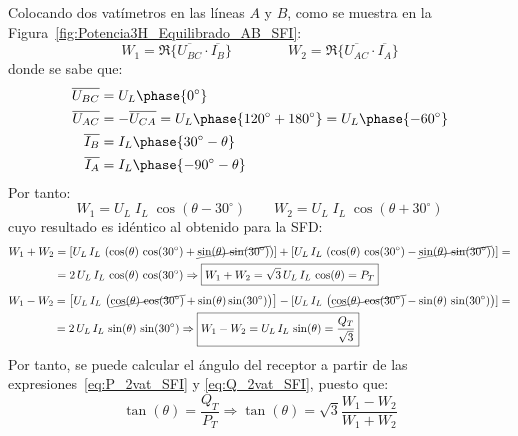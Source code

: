 	Colocando dos vatímetros en las líneas $A$ y $B$, como se muestra en la Figura~\ref{fig:Potencia3H_Equilibrado_AB_SFI}:
	\begin{equation*}
	    W_1=\Re\{\overline{U_{BC}} \cdot \overline{I_B}\}\qquad\qquad W_2=\Re\{\overline{U_{AC}} \cdot \overline{I_A}\}
	\end{equation*}
	donde se sabe que:
	\begin{align*}
	    \overline{U_{BC}}&=U_L\phase{0^\circ}\\
	   \overline{U_{AC}}&=-\overline{U_{CA}}=U_L\phase{120^\circ+180^\circ}=U_L\phase{-60^\circ}\\ \overline{I_B}&=I_L\phase{30^\circ-\theta} \\  \overline{I_A}&=I_L\phase{-90^\circ-\theta}
	\end{align*}
	Por tanto: 
	\begin{equation*}
	    W_1=U_L\;I_L\;\cos{(\theta-30^\circ)}\qquad W_2={U_L}\; {I_L}\;\cos{(\theta+30^\circ)}
	\end{equation*}
	cuyo resultado es idéntico al obtenido para la SFD: 
\begin{align}\label{eq:P_2vat_SFI}
    W_1+W_2&=\left[ U_L\,I_L\,\left( \cos(\theta)\,\cos({30^\circ}) + \cancel{\sin(\theta)\,\sin({30^\circ})}\right) \right] + [U_L\,I_L\,\left( \cos(\theta)\,\cos({30^\circ}) - \cancel{\sin(\theta)\,\sin({30^\circ})}\right) ]=\nonumber\\
    &=2\,U_L\,I_L\,\cos(\theta)\,\cos({30^\circ}) \Rightarrow \boxed{W_1 + W_2 = \sqrt{3}\,U_L\, I_L\,\cos(\theta) = P_T}
\end{align}
\begin{align}\label{eq:Q_2vat_SFI}
    W_1-W_2&=\left[U_L\,I_L\,\left( \cancel{\cos(\theta)\,\cos({30^\circ})} + \sin(\theta)\sin({30^\circ})\right)\right] - [U_L\,I_L\,\left( \cancel{\cos(\theta)\,\cos({30^\circ})} - \sin(\theta)\,\sin({30^\circ})\right) ]=\nonumber\\
    &=2\,U_L\,I_L\,\sin(\theta)\,\sin({30^\circ}) \Rightarrow \boxed{W_1 - W_2 = U_L\, I_L\,\sin(\theta) = \frac{Q_T}{\sqrt{3}}}
\end{align}
Por tanto, se puede calcular el ángulo del receptor a partir de las expresiones~\eqref{eq:P_2vat_SFI} y \eqref{eq:Q_2vat_SFI}, puesto que:
\begin{equation}
    \tan(\theta) = \dfrac{Q_T}{P_T}\Rightarrow \boxed{\tan(\theta) = \sqrt{3} \frac{W_1 - W_2}{W_1 + W_2}}
\end{equation}

